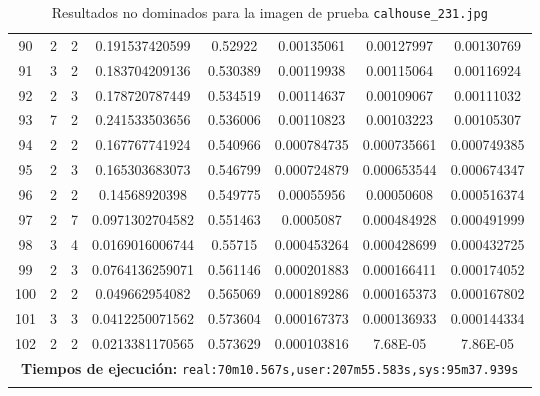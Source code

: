 \begin{longtable}{|c|c|c|c|c|c|c|c|}
90 & 2 & 2 & 0.191537420599 & 0.52922 & 0.00135061 & 0.00127997 & 0.00130769 \\
91 & 3 & 2 & 0.183704209136 & 0.530389 & 0.00119938 & 0.00115064 & 0.00116924 \\
92 & 2 & 3 & 0.178720787449 & 0.534519 & 0.00114637 & 0.00109067 & 0.00111032 \\
93 & 7 & 2 & 0.241533503656 & 0.536006 & 0.00110823 & 0.00103223 & 0.00105307 \\
94 & 2 & 2 & 0.167767741924 & 0.540966 & 0.000784735 & 0.000735661 & 0.000749385 \\
95 & 2 & 3 & 0.165303683073 & 0.546799 & 0.000724879 & 0.000653544 & 0.000674347 \\
96 & 2 & 2 & 0.14568920398 & 0.549775 & 0.00055956 & 0.00050608 & 0.000516374 \\
97 & 2 & 7 & 0.0971302704582 & 0.551463 & 0.0005087 & 0.000484928 & 0.000491999 \\
98 & 3 & 4 & 0.0169016006744 & 0.55715 & 0.000453264 & 0.000428699 & 0.000432725 \\
99 & 2 & 3 & 0.0764136259071 & 0.561146 & 0.000201883 & 0.000166411 & 0.000174052 \\
100 & 2 & 2 & 0.049662954082 & 0.565069 & 0.000189286 & 0.000165373 & 0.000167802 \\
101 & 3 & 3 & 0.0412250071562 & 0.573604 & 0.000167373 & 0.000136933 & 0.000144334 \\
102 & 2 & 2 & 0.0213381170565 & 0.573629 & 0.000103816 & 7.68E-05 & 7.86E-05 \\
\hline
\multicolumn{8}{|c|}{\textbf{Tiempos de ejecución:} \texttt{real:70m10.567s,user:207m55.583s,sys:95m37.939s}}\\  \hline
\caption{Resultados no dominados para la imagen de prueba \texttt{calhouse\_231.jpg}}
\label{tab:calhouse_231}
\end{longtable}
\normalsize

